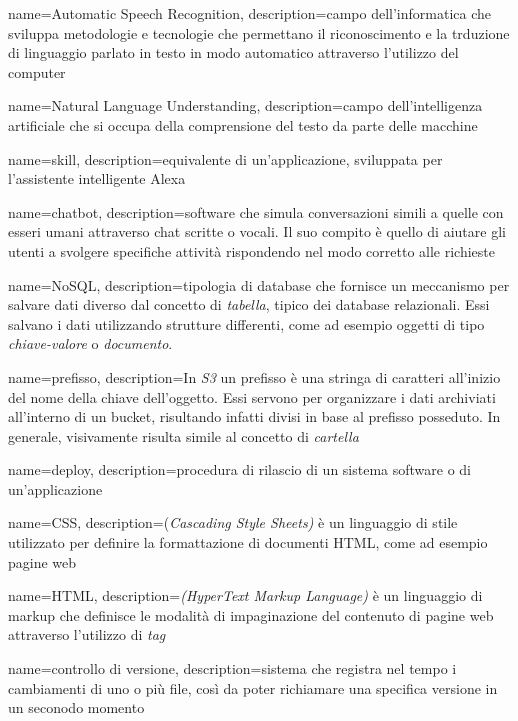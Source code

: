 {
	name=Automatic Speech Recognition,
	description={campo dell'informatica che sviluppa metodologie e tecnologie che permettano il riconoscimento e 
		la trduzione di linguaggio parlato in testo in modo automatico attraverso l'utilizzo del computer}
}

{
	name=Natural Language Understanding,
	description={campo dell'intelligenza artificiale che si occupa della comprensione del testo da parte delle macchine}
}

{
	name=skill,
	description={equivalente di un'applicazione, sviluppata per l'assistente intelligente Alexa}
}

{
	name=chatbot,
	description={software che simula conversazioni simili a quelle con esseri umani attraverso chat scritte o vocali. Il suo compito è quello di aiutare gli utenti a svolgere specifiche attività rispondendo nel modo corretto alle  richieste}
}

{
	name=NoSQL,
	description={tipologia di database che fornisce un meccanismo per salvare dati diverso dal concetto di
	\emph{tabella}, tipico dei database relazionali. Essi salvano i dati utilizzando strutture differenti, come ad
	esempio oggetti di tipo \emph{chiave-valore} o \emph{documento}}.
}

{
	name=prefisso,
	description={In \emph{S3} un prefisso è una stringa di caratteri all'inizio del nome della chiave dell'oggetto. 
	Essi servono per organizzare i dati archiviati all'interno di un bucket, risultando infatti divisi in base al 
	prefisso posseduto. In generale, visivamente risulta simile al concetto di \emph{cartella}}
}

{
	name=deploy,
	description={procedura di rilascio di un sistema software o di un’applicazione}
}

{
	name=CSS,
	description={(\emph{Cascading Style Sheets)} è un linguaggio di stile utilizzato per definire la formattazione di 
	documenti \gls{HTML}, come ad esempio pagine web}
}

{
	name=HTML,
	description={\emph{(HyperText Markup Language)} è un linguaggio di markup che definisce le modalità di impaginazione
	del contenuto di pagine web attraverso l'utilizzo di \emph{tag}}
}

{
	name=controllo di versione,
	description={sistema che registra nel tempo i cambiamenti di uno o più file, così da poter richiamare una specifica versione in un seconodo momento}
}

